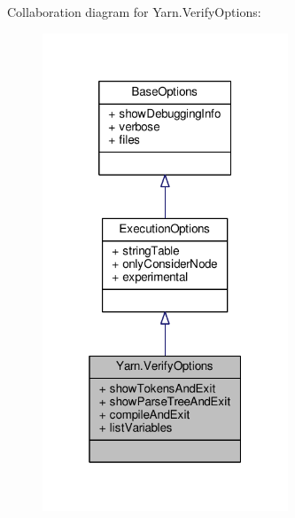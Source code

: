 Collaboration diagram for Yarn.\-Verify\-Options\-:
\nopagebreak
\begin{figure}[H]
\begin{center}
\leavevmode
\includegraphics[width=208pt]{a00739}
\end{center}
\end{figure}
